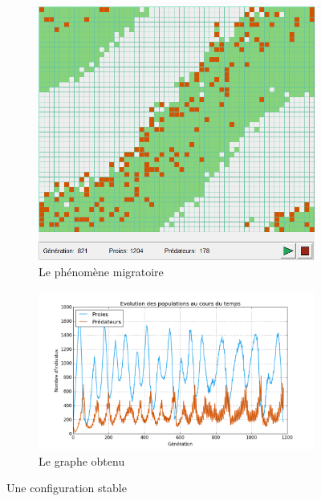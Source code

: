 \documentclass[11pt]{article}
\begin{document}
\begin{figure}[!ht]
    \begin{subfigure}{0.49\textwidth}
        \includegraphics[width=\linewidth]{phenomene_migratoire2.png} 
        \caption{Le phénomène migratoire}
    \end{subfigure}
    \begin{subfigure}{0.49\textwidth}
        \includegraphics[width=\linewidth]{graphe_config_stable.png}
        \caption{Le graphe obtenu}
    \end{subfigure}
     
    \caption{Une configuration stable}
    \label{fig:stable}
\end{figure}
\end{document}
